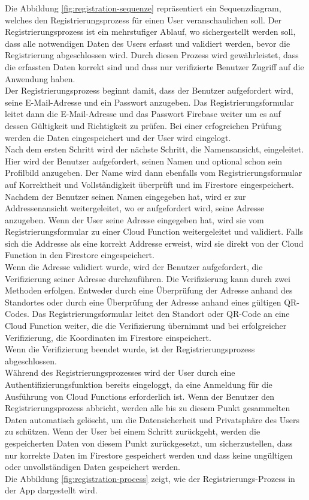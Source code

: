Die Abbildung \ref{fig:registration-sequenze} repräsentiert ein Sequenzdiagram, welches den Registrierungsprozess für einen User veranschaulichen soll. Der Registrierungsprozess ist ein mehrstufiger Ablauf, wo sichergestellt werden soll, dass alle notwendigen Daten des Users erfasst und validiert werden, bevor die Registrierung abgeschlossen wird. Durch diesen Prozess wird gewährleistet, dass die erfassten Daten korrekt sind und dass nur verifizierte Benutzer Zugriff auf die Anwendung haben.
\\
Der Registrierungsprozess beginnt damit, dass der Benutzer aufgefordert wird, seine E-Mail-Adresse und ein Passwort anzugeben. Das Registrierungsformular leitet dann die E-Mail-Adresse und das Passwort Firebase weiter um es auf dessen Gültigkeit und Richtigkeit zu prüfen. Bei einer erfogreichen Prüfung werden die Daten eingespeichert und der User wird eingelogt.
\\
Nach dem ersten Schritt wird der nächste Schritt, die Namensansicht, eingeleitet. Hier wird der Benutzer aufgefordert, seinen Namen und optional schon sein Profilbild anzugeben. Der Name wird dann ebenfalls vom Registrierungsformular auf Korrektheit und Vollständigkeit überprüft und im Firestore eingespeichert.
\\
Nachdem der Benutzer seinen Namen eingegeben hat, wird er zur Addressenansicht weitergeleitet, wo er aufgefordert wird, seine Adresse anzugeben. Wenn der User seine Adresse eingegeben hat, wird sie vom Registrierungsformular zu einer Cloud Function weitergeleitet und validiert. Falls sich die Addresse als eine korrekt Addresse erweist, wird sie direkt von der Cloud Function in den Firestore eingespeichert.
\\
Wenn die Adresse validiert wurde, wird der Benutzer aufgefordert, die Verifizierung seiner Adresse durchzuführen. Die Verifizierung kann durch zwei Methoden erfolgen. Entweder durch eine Überprüfung der Adresse anhand des Standortes oder durch eine Überprüfung der Adresse anhand eines gültigen QR-Codes. Das Registrierungsformular leitet den Standort oder QR-Code an eine Cloud Function weiter, die die Verifizierung übernimmt und bei erfolgreicher Verifizierung, die Koordinaten im Firestore einspeichert.
\\
Wenn die Verifizierung beendet wurde, ist der Registrierungsprozess abgeschlossen.
\\
Während des Registrierungsprozesses wird der User durch eine Authentifizierungsfunktion bereits eingeloggt, da eine Anmeldung für die Ausführung von Cloud Functions erforderlich ist. Wenn der Benutzer den Registrierungsprozess abbricht, werden alle bis zu diesem Punkt gesammelten Daten automatisch gelöscht, um die Datensicherheit und Privatsphäre des Users zu schützen. Wenn der User bei einem Schritt zurückgeht, werden die gespeicherten Daten von diesem Punkt zurückgesetzt, um sicherzustellen, dass nur korrekte Daten im Firestore gespeichert werden und dass keine ungültigen oder unvollständigen Daten gespeichert werden.
\\
Die Abbildung \ref{fig:registration-process} zeigt, wie der Registrierungs-Prozess in der App dargestellt wird.

